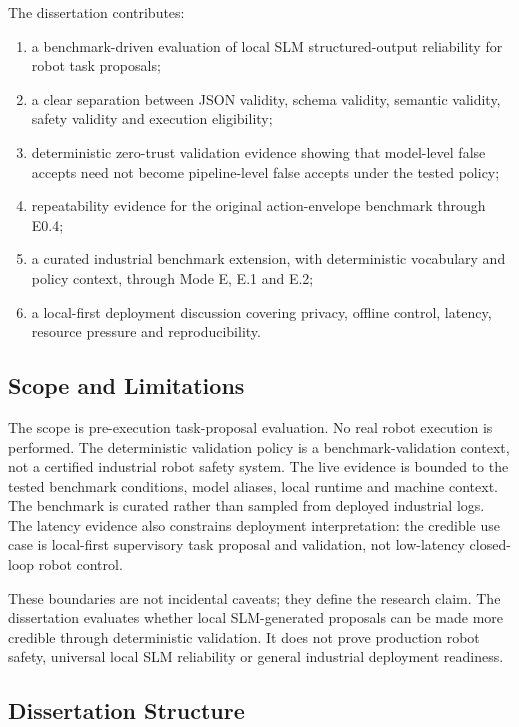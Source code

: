 \documentclass[sigconf,nonacm]{acmart}
\begin{document}
The dissertation contributes:
\begin{enumerate}
    \item a benchmark-driven evaluation of local SLM structured-output reliability for robot task proposals;
    \item a clear separation between JSON validity, schema validity, semantic validity, safety validity and execution eligibility;
    \item deterministic zero-trust validation evidence showing that model-level false accepts need not become pipeline-level false accepts under the tested policy;
    \item repeatability evidence for the original action-envelope benchmark through E0.4;
    \item a curated industrial benchmark extension, with deterministic vocabulary and policy context, through Mode E, E.1 and E.2;
    \item a local-first deployment discussion covering privacy, offline control, latency, resource pressure and reproducibility.
\end{enumerate}

\subsection{Scope and Limitations}
\label{sec:introduction_scope}

The scope is pre-execution task-proposal evaluation. No real robot execution is performed. The deterministic validation policy is a benchmark-validation context, not a certified industrial robot safety system. The live evidence is bounded to the tested benchmark conditions, model aliases, local runtime and machine context. The benchmark is curated rather than sampled from deployed industrial logs. The latency evidence also constrains deployment interpretation: the credible use case is local-first supervisory task proposal and validation, not low-latency closed-loop robot control.

These boundaries are not incidental caveats; they define the research claim. The dissertation evaluates whether local SLM-generated proposals can be made more credible through deterministic validation. It does not prove production robot safety, universal local SLM reliability or general industrial deployment readiness.

\subsection{Dissertation Structure}
\label{sec:introduction_structure}
\end{document}
